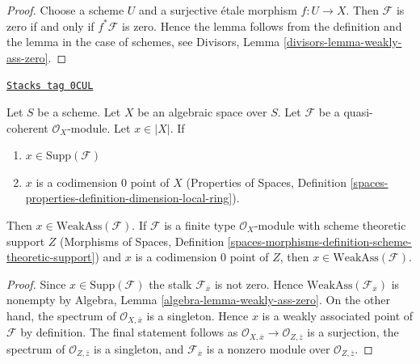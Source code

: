 \begin{proof}
Choose a scheme $U$ and a surjective \'etale morphism $f : U \to X$.
Then $\mathcal{F}$ is zero if and only if $f^*\mathcal{F}$ is zero.
Hence the lemma follows from the definition and the lemma in the
case of schemes, see
Divisors, Lemma \ref{divisors-lemma-weakly-ass-zero}.
\end{proof}

\begin{lemma}
\label{spaces-divisors-lemma-minimal-support-in-weakly-ass}
\href{https://stacks.math.columbia.edu/tag/0CUL}{\texttt{Stacks tag 0CUL}}

Let $S$ be a scheme. Let $X$ be an algebraic space over $S$.
Let $\mathcal{F}$ be a quasi-coherent $\mathcal{O}_X$-module.
Let $x \in |X|$. If
\begin{enumerate}
\item $x \in \text{Supp}(\mathcal{F})$
\item $x$ is a codimension $0$ point of $X$
(Properties of Spaces, Definition
\ref{spaces-properties-definition-dimension-local-ring}).
\end{enumerate}
Then $x \in \text{WeakAss}(\mathcal{F})$. If $\mathcal{F}$
is a finite type $\mathcal{O}_X$-module with scheme theoretic support $Z$
(Morphisms of Spaces, Definition
\ref{spaces-morphisms-definition-scheme-theoretic-support})
and $x$ is a codimension $0$ point of $Z$, then
$x \in \text{WeakAss}(\mathcal{F})$.
\end{lemma}

\begin{proof}
Since $x \in \text{Supp}(\mathcal{F})$ the stalk
$\mathcal{F}_{\overline{x}}$ is not zero. Hence
$\text{WeakAss}(\mathcal{F}_{\overline{x}})$
is nonempty by
Algebra, Lemma \ref{algebra-lemma-weakly-ass-zero}.
On the other hand, the spectrum of $\mathcal{O}_{X, \overline{x}}$
is a singleton. Hence $x$ is a weakly associated point of
$\mathcal{F}$ by definition. The final statement follows
as $\mathcal{O}_{X, \overline{x}} \to \mathcal{O}_{Z, \overline{z}}$
is a surjection, the spectrum of $\mathcal{O}_{Z, \overline{z}}$
is a singleton, and $\mathcal{F}_{\overline{x}}$ is a nonzero
module over $\mathcal{O}_{Z, \overline{z}}$.
\end{proof}

